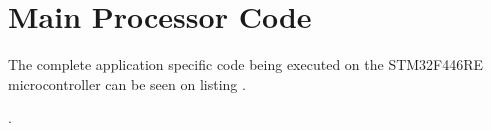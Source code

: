 \chapter{Main Processor Code} \label{App:MCUCode}

The complete application specific code being executed on the STM32F446RE microcontroller can be seen on listing .

. 